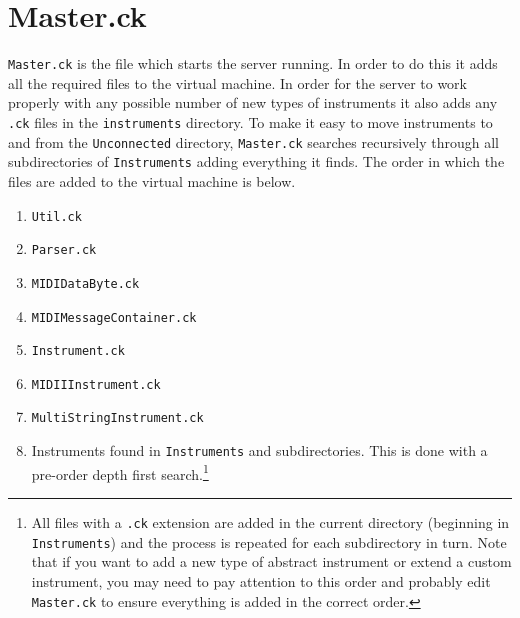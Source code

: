 \documentclass[11pt]{article}
\begin{document}
\section{Master.ck}
\texttt{Master.ck} is the file which starts the server running. In order to do this it adds all the required files to the virtual machine. In order for the server to work 
properly with any possible number of new types of instruments it also adds any \texttt{.ck} files in the \texttt{instruments} directory. To make it easy to move
 instruments to and from the \texttt{Unconnected} directory, \texttt{Master.ck} searches recursively through all subdirectories of \texttt{Instruments} adding 
everything it finds. The order in which the files are added to the virtual machine is below.

\begin{enumerate} [\bf 1.]
	\item\texttt{Util.ck}
	\item\texttt{Parser.ck}
	\item\texttt{MIDIDataByte.ck}
	\item\texttt{MIDIMessageContainer.ck}
	\item\texttt{Instrument.ck}
	\item\texttt{MIDIIInstrument.ck}
	\item\texttt{MultiStringInstrument.ck}
	\item Instruments found in \texttt{Instruments} and subdirectories. This is done with a pre-order depth first search.\footnote{All files with a \texttt{.ck} 
	extension are added in the current directory (beginning in \texttt{Instruments}) and the process is repeated for each subdirectory in turn. Note that if you
	want to add a new type of abstract instrument or extend a custom instrument, you may need to pay attention to this order and probably edit 
	\texttt{Master.ck} to ensure everything is added in the correct order.}
\end{enumerate}
\end{document}
